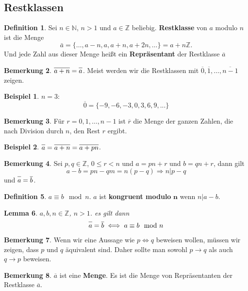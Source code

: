 \documentclass{article}
\theoremstyle{definition}
\newtheorem{definition}{Definition}[section]
\newtheorem{bem}[definition]{Bemerkung}
\newtheorem*{bei*}{Beispiel}
\theoremstyle{plain}
\newtheorem{lem}[definition]{Lemma}
\begin{document}
\subsection{Restklassen}
\begin{definition}
	Sei $ n \in \mathbb{N} $, $ n > 1 $ und $ a \in \mathbb{Z} $ beliebig. \textbf{Restklasse} von $ a $ modulo $ n $ ist die Menge
	\[ 
	\bar{a} = \{ \ldots , a-n , a , a+n , a+2n, \ldots \} = a + n\mathbb{Z}.
	 \]
	Und jede Zahl aus dieser Menge heißt ein \textbf{Repräsentant} der Restklasse $ \overline{a} $
\end{definition}
\begin{bem}
	$ \overline{a + n} = \overline{\vphantom{+}a} $.
	Meist werden wir die Restklassen mit $ \overline{0} , \overline{1} , \ldots , \overline{n-1} $ zeigen.
\end{bem}
\begin{bei*}
	$ n = 3 $: 
	\[ 
	\overline{0} = \{ -9 , -6 , -3 , 0 ,3 , 6 , 9 , ... \}
	 \]
\end{bei*}
\begin{bem}
	F\"ur $ r = 0,1,\ldots , n-1 $ ist $ \overline{r} $ die Menge der ganzen Zahlen, die nach Division durch $ n $, den Rest $ r $ ergibt.
\end{bem}
\begin{bei*}
	$\overline{a\vphantom{+}} = \overline{a+n} = \overline{a+ pn} $.
\end{bei*}
\begin{bem}
	Sei $ p,q \in \mathbb{Z} $, $ 0 \leq r < n $ und $ a = pn+r $ und $ b = qn+r $, dann gilt 
	\[ 
	a - b = pn - qm = n(p-q) \Rightarrow n | p-q
	 \]
	und $ \overline{\vphantom{b}a} = \overline{b} $.
\end{bem}
\begin{definition}
	$ a \equiv b \mod n $. $ a $ ist \textbf{kongruent modulo} $ \mathbf{n} $ wenn $ n | a-b $.
\end{definition}
\begin{lem}
	$ a,b,n \in \mathbb{Z} $, $ n > 1 $. es gilt dann 
	\[ 
	\overline{\vphantom{b}a} = \overline{b} \iff a \equiv b \mod n
	 \]
\end{lem}
\begin{bem}
	Wenn wir eine Aussage wie $ p \iff q $ beweisen wollen, m\"ussen wir zeigen, dass $ p $ und 
	$ q $ \"aquivalent sind. Daher sollte man sowohl $ p \to q $ als auch $ q \to p $ beweisen.
\end{bem}
\begin{bem}
	$ \overline{a} $ ist eine \textbf{Menge}. Es ist die Menge von Repr\"asentanten der Restklasse $ \overline{a} $.
\end{bem}
\end{document}
